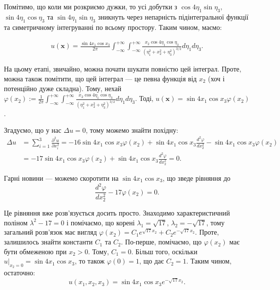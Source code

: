 \documentclass{hw_template}
\begin{document}
Помітимо, що коли ми розкриємо дужки, то усі добутки з $\cos 4\eta_1 \sin
\eta_3$, $\sin 4\eta_1\cos\eta_3$ та $\sin 4\eta_1 \sin \eta_3$ зникнуть через
непарність підінтегральної функції та симетричному інтегруванні по всьому
простору. Таким чином, маємо:

\begin{align*}
    u(\mathbf{x}) = \frac{\sin 4x_1 \cos x_3}{2\pi}\int_{-\infty}^{+\infty}\int_{-\infty}^{+\infty} \frac{x_2\cos 4\eta_1 \cos \eta_3}{(\eta_1^2+x_2^2+\eta_3^2)^{3/2}}d\eta_1d\eta_3.
\end{align*}

На цьому етапі, звичайно, можна почати шукати повністю цей інтеграл. Проте,
можна також помітити, що цей інтеграл --- це певна функція від $x_2$ (хоч і
потенційно дуже складна). Тому, нехай $\varphi(x_2) :=
\frac{1}{2\pi}\int_{-\infty}^{+\infty}\int_{-\infty}^{+\infty} \frac{x_2\cos 4\eta_1 \cos
\eta_3}{(\eta_1^2+x_2^2+\eta_3^2)^{3/2}}d\eta_1d\eta_3$. Тоді, $u(\mathbf{x}) = \sin 4x_1 \cos x_3 \varphi(x_2)$.

Згадуємо, що у нас $\Delta u = 0$, тому можемо знайти похідну:
\begin{align*}
    \Delta u &= \sum_{i=1}^3 \frac{\partial^2 u}{\partial x_i^2} = -16\sin 4x_1\cos x_3\varphi(x_2) + \sin 4x_1 \cos x_3 \frac{d^2\varphi}{dx_2^2} - \sin 4x_1 \cos x_3 \varphi(x_2) \\
    &= -17\sin 4x_1 \cos x_3 \varphi(x_2) + \sin 4x_1 \cos x_3 \frac{d^2\varphi}{dx_2^2} = 0.
\end{align*}

Гарні новини --- можемо скоротити на $\sin 4x_1 \cos x_3$, що зведе рівняння до
\begin{equation*}
    \frac{d^2\varphi}{dx_2^2} - 17\varphi(x_2) = 0.
\end{equation*}

Це рівняння вже розв'язується досить просто. Знаходимо характеристичний поліном
$\lambda^2-17=0$ і помічаємо, що корені $\lambda_1=\sqrt{17}$,
$\lambda_2=-\sqrt{17}$, тому загальний розв'язок має вигляд $\varphi(x_2) =
C_1e^{\sqrt{17}x_2} + C_2e^{-\sqrt{17}x_2}$. Проте, залишилось знайти константи
$C_1$ та $C_2$. По-перше, помічаємо, що $\varphi(x_2)$ має бути обмеженою при
$x_2>0$. Тому, $C_1=0$. Більш того, оскільки $u\Big|_{x_2=0}=\sin 4x_1 \cos x_3$,
то також $\varphi(0)=1$, що дає $C_2=1$. Таким чином, остаточно:
\begin{equation*}
    \boxed{u(x_1,x_2,x_3) = \sin 4x_1 \cos x_3 e^{-\sqrt{17}x_2}}.
\end{equation*}
\end{document}
